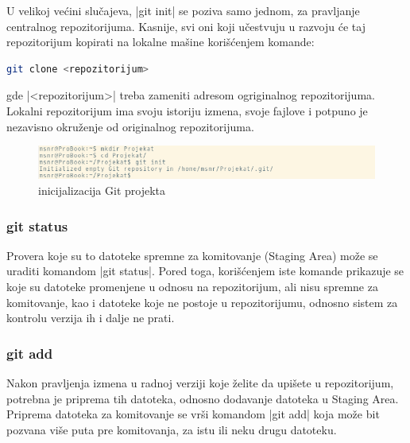 \documentclass[a4paper]{article}
\begin{document}
{U velikoj većini slučajeva, |git init| se poziva samo jednom, za pravljanje centralnog repozitorijuma. Kasnije, svi oni koji učestvuju u razvoju će taj repozitorijum kopirati na lokalne mašine korišćenjem komande:
\begin{lstlisting}[language=bash]
git clone <repozitorijum>
\end{lstlisting}
\noindent
gde |<repozitorijum>| treba zameniti adresom ogriginalnog repozitorijuma. Lokalni repozitorijum ima svoju istoriju izmena, svoje fajlove i potpuno je nezavisno okruženje od originalnog repozitorijuma. 

\begin{figure}[h!]
\begin{center}
\includegraphics[scale=0.55]{images/init.png}
\end{center}
\caption{inicijalizacija Git projekta}
\label{fig:git_init}
\end{figure}

\subsubsection*{git status}
\label{subsec:git_status}
Provera koje su to datoteke spremne za komitovanje (Staging Area) može se uraditi komandom |git status|. Pored toga, korišćenjem iste komande prikazuje se koje su datoteke promenjene u odnosu na repozitorijum, ali nisu spremne za komitovanje, kao i datoteke koje ne postoje u repozitorijumu, odnosno sistem za kontrolu verzija ih i dalje ne prati.

\subsubsection*{git add}
\label{subsec:git_add}
Nakon pravljenja izmena u radnoj verziji koje želite da upišete u repozitorijum, potrebna je priprema tih datoteka, odnosno dodavanje datoteka u Staging Area. Priprema datoteka za komitovanje se vrši komandom |git add| koja može bit pozvana više puta pre komitovanja, za istu ili neku drugu datoteku.


}
\end{document}
